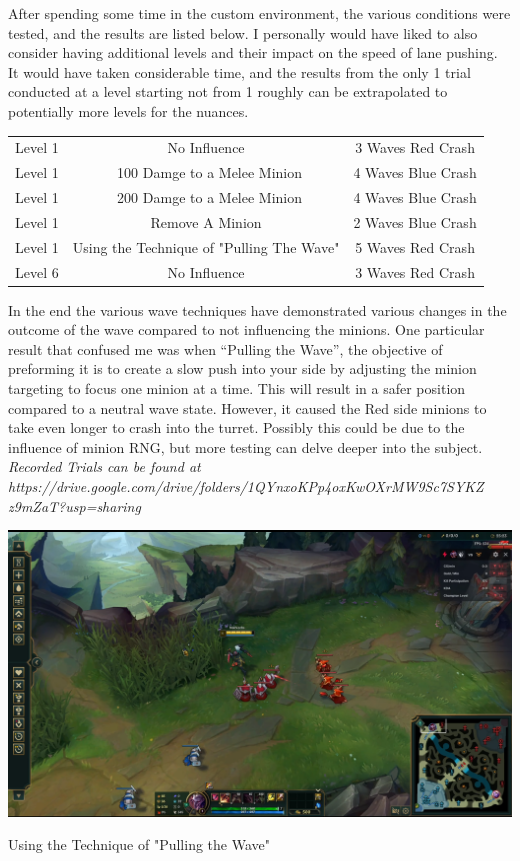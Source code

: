 \documentclass{article}
\begin{document}
After spending some time in the custom environment, the various conditions were tested, and the results are listed below. I personally would have liked to also consider having additional levels and their impact on the speed of lane pushing. It would have taken considerable time, and the results from the only 1 trial conducted at a level starting not from 1 roughly can be extrapolated to potentially more levels for the nuances.
\begin{center}
\begin{tabular}{ c c c}
  Level 1 & No Influence & 3 Waves Red Crash\\ 
  Level 1 & ~100 Damge to  a Melee Minion & 4 Waves Blue Crash\\  
  Level 1 & ~200 Damge to  a Melee Minion & 4 Waves Blue Crash\\  
  Level 1 & Remove A Minion & 2 Waves Blue Crash\\  
  Level 1 & Using the Technique of "Pulling The Wave"  & 5 Waves Red Crash\\
  Level 6 & No Influence  & 3 Waves Red Crash
\end{tabular}
\end{center}
In the end the various wave techniques have demonstrated various changes in the outcome of the wave compared to not influencing the minions. One particular result that confused me was when “Pulling the Wave”, the objective of preforming it is to create a slow push into your side by adjusting the minion targeting to focus one minion at a time. This will result in a safer position compared to a neutral wave state. However, it caused the Red side minions to take even longer to crash into the turret. Possibly this could be due to the influence of minion RNG, but more testing can delve deeper into the subject.
\textit{Recorded Trials can be found at \\https://drive.google.com/drive/folders/1QYnxoKPp4oxKwOXrMW9Sc7SYKZ\\z9mZaT?usp=sharing}
\begin{table}[h]
  \includegraphics[width=\textwidth]{PullingTheWave.PNG}
  \caption[Pulling the Wave]{Using the Technique of "Pulling the Wave"}
  \end{table}
\end{document}
